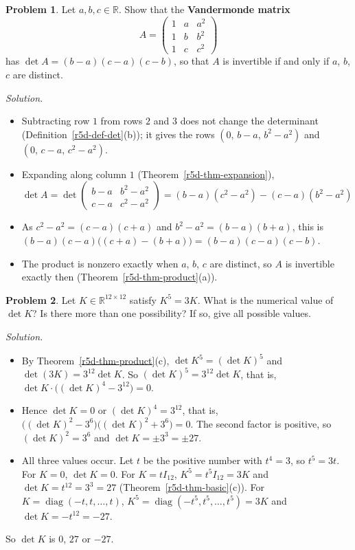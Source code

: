\documentclass[12pt]{article}
\newcommand{\R}{\mathbb R}
\DeclareMathOperator{\diag}{diag}
\theoremstyle{definition}
\newtheorem{problem}{Problem}
\newenvironment{solution}{\par\noindent\textit{Solution.}\ }{\par\smallskip}
\begin{document}
\begin{problem}\label{r5d-ex-vandermonde}
Let \(a,b,c\in\R\). Show that the \textbf{Vandermonde matrix}
\[
A=\begin{pmatrix}1&a&a^2\\1&b&b^2\\1&c&c^2\end{pmatrix}
\]
has \(\det A=(b-a)(c-a)(c-b)\), so that \(A\) is invertible if and only if \(a\), \(b\), \(c\) are distinct.
\end{problem}
\begin{solution}
\begin{itemize}
\item Subtracting row \(1\) from rows \(2\) and \(3\) does not change the determinant
(Definition~\ref{r5d-def-det}(b)); it gives the rows \((0,\,b-a,\,b^2-a^2)\) and \((0,\,c-a,\,c^2-a^2)\).
\item Expanding along column \(1\) (Theorem~\ref{r5d-thm-expansion}),
\[
\det A=\det\begin{pmatrix}b-a&b^2-a^2\\c-a&c^2-a^2\end{pmatrix}=(b-a)(c^2-a^2)-(c-a)(b^2-a^2)
\]
\item As \(c^2-a^2=(c-a)(c+a)\) and \(b^2-a^2=(b-a)(b+a)\), this is
\((b-a)(c-a)\bigl((c+a)-(b+a)\bigr)=(b-a)(c-a)(c-b)\).
\item The product is nonzero exactly when \(a\), \(b\), \(c\) are distinct, so \(A\) is invertible exactly then
(Theorem~\ref{r5d-thm-product}(a)).\qedhere
\end{itemize}
\end{solution}

\begin{problem}\label{r5d-ex-k-power}
Let \(K\in\R^{12\times12}\) satisfy \(K^5=3K\). What is the numerical value of \(\det K\)? Is there more
than one possibility? If so, give all possible values.
\end{problem}
\begin{solution}
\begin{itemize}
\item By Theorem~\ref{r5d-thm-product}(c), \(\det K^5=(\det K)^5\) and \(\det(3K)=3^{12}\det K\). So
\((\det K)^5=3^{12}\det K\), that is, \(\det K\cdot\bigl((\det K)^4-3^{12}\bigr)=0\).
\item Hence \(\det K=0\) or \((\det K)^4=3^{12}\), that is,
\(\bigl((\det K)^2-3^6\bigr)\bigl((\det K)^2+3^6\bigr)=0\). The second factor is positive, so
\((\det K)^2=3^6\) and \(\det K=\pm3^3=\pm27\).
\item All three values occur. Let \(t\) be the positive number with \(t^4=3\), so \(t^5=3t\). For
\(K=0\), \(\det K=0\). For \(K=tI_{12}\), \(K^5=t^5I_{12}=3K\) and \(\det K=t^{12}=3^3=27\) (Theorem~\ref{r5d-thm-basic}(c)). For
\(K=\diag(-t,t,\dots,t)\), \(K^5=\diag(-t^5,t^5,\dots,t^5)=3K\) and \(\det K=-t^{12}=-27\).
\end{itemize}
So \(\det K\) is \(0\), \(27\) or \(-27\).
\end{solution}
\end{document}
